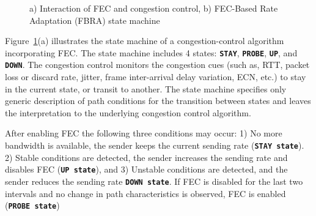 
\begin{figure}
  \centerline{
}
\caption{a) Interaction of FEC and congestion control, b) FEC-Based Rate
Adaptation (FBRA) state machine }
\label{fig:fecrc-intro}
\end{figure}

Figure~\ref{fig:fecrc-intro}(a) illustrates the state machine of a
congestion-control algorithm incorporating FEC. The state machine includes 4
states: \texttt{\textbf{STAY}}, \texttt{\textbf{PROBE}}, \texttt{\textbf{UP}},
and \texttt{\textbf{DOWN}}. The congestion control monitors the congestion
cues (such as, RTT, packet loss or discard rate, jitter, frame inter-arrival
delay variation, ECN, etc.) to stay in the current state, or transit to
another. The state machine specifies only generic description of path
conditions for the transition between states and leaves the interpretation to
the underlying congestion control algorithm.

After enabling FEC the following three conditions may occur: 1) No more
bandwidth is available, the sender keeps the current sending rate
(\texttt{\textbf{STAY state}}). 2) Stable conditions are detected, the sender
increases the sending rate and disables FEC (\texttt{\textbf{UP state}}), and
3) Unstable conditions are detected, and the sender reduces the sending rate
\texttt{\textbf{DOWN state}}. If FEC is disabled for the last two intervals
and no change in path characteristics is observed, FEC is enabled
(\texttt{\textbf{PROBE state}})



\begin{figure}
  \centerline{
}
\caption{}
\label{fig:fecrc-var}
\end{figure}

